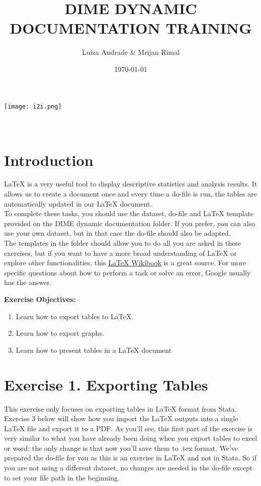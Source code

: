 \documentclass[12pts]{report}
\title{DIME DYNAMIC DOCUMENTATION TRAINING }
\author{Luiza Andrade \& Mrijan Rimal}
\date{\today}
\begin{document}
	

\makeatletter
\begin{titlepage}
	\begin{center}
		\texttt{[image: i2i.png]}\\[10ex]
		{\LARGE \bfseries  \@title }\\[2ex] 
		{\Large  \@author}\\[20ex] 
		{\large \@date}
	\end{center}
\end{titlepage}
\makeatother

\section*{Introduction}
{\LaTeX} is a very useful tool to display descriptive statistics and analysis results. It allows us to create a document once and every time a do-file is run, the tables are automatically updated in our LaTeX document. \\

To complete these tasks, you should use the dataset, do-file and {\LaTeX} template provided on the DIME dynamic documentation folder. If you prefer, you can also use your own dataset, but in that case the do-file should also be adapted. \\

The templates in the folder should allow you to do all you are asked in these exercises, but if you want to have a more broad understanding of {\LaTeX} or explore other functionalities, this \href{https://en.wikibooks.org/wiki/LaTeX
}{{\LaTeX} Wikibook} is a great source. For more specific questions about how to perform a task or solve an error, Google usually has the answer.

\textbf{Exercise Objectives:}
\begin{enumerate}
	\item Learn how to export tables to {\LaTeX}.
	\item Learn how to export graphs.
	\item Learn how to present tables in a {\LaTeX} document
\end{enumerate}

\section*{Exercise 1. Exporting Tables}
This exercise only focuses on exporting tables in {\LaTeX} format from Stata. Exercise 3 below will show how you import the LaTeX outputs into a single {\LaTeX} file and export it to a PDF. As you'll see, this first part of the exercise is very similar to what you have already been doing when you export tables to excel or word: the only change is that now you'll save them to .tex format. We've prepared the do-file for you as this is an exercise in {\LaTeX} and not in Stata. So if you are not using a different dataset, no changes are needed in the do-file except to set your file path in the beginning. \\
\end{document}
